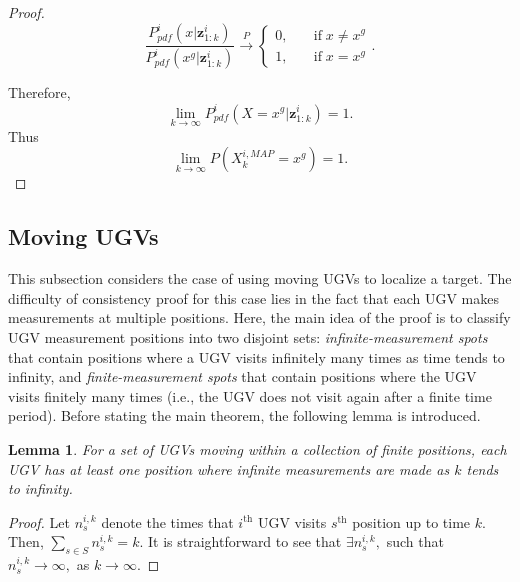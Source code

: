 \documentclass[journal]{IEEEtranTIE}
\newtheorem{lem}{\bfseries Lemma}
\theoremstyle{remark}
\newcommand{\X}{X}
\newcommand{\xg}{x^g}
\begin{document}
\begin{proof}
		\begin{equation*}
			\frac{P^i_{pdf}(x|\mathbf{z}^{i}_{1:k})}{P^i_{pdf}(\xg|\mathbf{z}^{i}_{1:k})}\overset{P}{\longrightarrow}
			\begin{cases}
				0,&\quad \text{if}\; x\neq \xg\\
				1,&\quad \text{if}\; x= \xg
			\end{cases}.
		\end{equation*}
		
		Therefore,
		\small\begin{equation*}
			\lim\limits_{k\rightarrow \infty}
			P_{pdf}^i(\X=\xg|\mathbf{z}^{i}_{1:k})=1.
		\end{equation*}\normalsize
		Thus
		\small\begin{equation*}
			\lim\limits_{k\rightarrow \infty}
			P(\X^{i,MAP}_k=\xg)=1.
		\end{equation*}\normalsize
	\end{proof}	
	
	\subsection{Moving UGVs}
	This subsection considers the case of using moving UGVs to localize a target.
	The difficulty of consistency proof for this case lies in the fact that each UGV makes measurements at multiple positions.
	Here, the main idea of the proof is to classify UGV measurement positions into two disjoint sets: \textit{infinite-measurement spots} that contain positions where a UGV visits infinitely many times as time tends to infinity, and \textit{finite-measurement spots} that contain positions where the UGV visits finitely many times (i.e., the UGV does not visit again after a finite time period).
	Before stating the main theorem, the following lemma is introduced.
	\begin{lem}\label{lem1}
		For a set of UGVs moving within a collection of finite positions, each UGV has at least one position where infinite measurements are made as $k$ tends to infinity.
	\end{lem}
	
	\begin{proof}
		Let $n^{i,k}_s$ denote the times that $i^\text{th}$ UGV visits $s^\text{th}$ position up to time $k$. Then, $\sum\limits_{s\in S} n^{i,k}_s=k$. It is straightforward to see that $\exists n^{i,k}_s,$ such that $n^{i,k}_s\rightarrow \infty,$ as $k\rightarrow \infty$.
	\end{proof}
	\medskip
	
\end{document}
